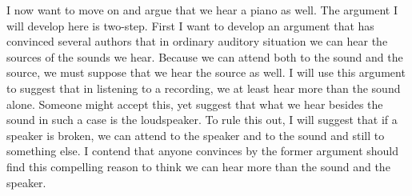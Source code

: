 \documentclass[sloppy, journal, git, bytitle, dodraft]{humapap}
\begin{document}




\sect I now want to move on and argue that we hear a piano as well. The argument I will develop here is two-step. First I want to develop an argument that has convinced several authors that in ordinary auditory situation we can hear the sources of the sounds we hear. Because we can attend both to the sound and the source, we must suppose that we hear the source as well. I will use this argument to suggest that in listening to a recording, we at least hear more than the sound alone. Someone might accept this, yet suggest that what we hear besides the sound in such a case is the loudspeaker. To rule this out, I will suggest that if a speaker is broken, we can attend to the speaker and to the sound and still to something else. I contend that anyone convinces by the former argument should find this compelling reason to think we can hear more than the sound and the speaker.
\end{document}
